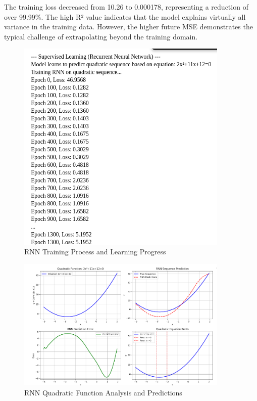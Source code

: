 \documentclass[11pt,a4paper]{article}
\begin{document}
The training loss decreased from 10.26 to 0.000178, representing a reduction of over 99.99\%. The high R² value indicates that the model explains virtually all variance in the training data. However, the higher future MSE demonstrates the typical challenge of extrapolating beyond the training domain.

\begin{figure}[H]
\centering
\includegraphics[width=0.9\textwidth]{ss/Supervised_Learning_Recurrent_Neural_Network_1.png}
\caption{RNN Training Process and Learning Progress}
\end{figure}

\begin{figure}[H]
\centering
\includegraphics[width=0.9\textwidth]{ss/rnn_quadratic_analysis_1.png}
\caption{RNN Quadratic Function Analysis and Predictions}
\end{figure}
\end{document}
